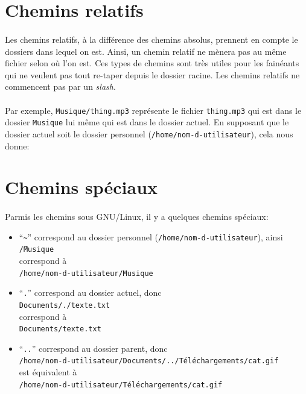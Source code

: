 \documentclass[french, a4paper, 12pt, titlepage]{article}
\begin{document}
\section{Chemins relatifs}

\paragraph{} Les chemins relatifs, à la différence des chemins absolus,
prennent en compte le dossiers dans lequel on est. Ainsi, un chemin relatif ne
mènera pas au même fichier selon où l'on est. Ces types de chemins sont très
utiles pour les fainéants qui ne veulent pas tout re-taper depuis le dossier
racine. Les chemins relatifs ne commencent pas par un \emph{slash}.

\paragraph{} Par exemple, \texttt{Musique/thing.mp3} représente le fichier
\texttt{thing.mp3} qui est dans le dossier \texttt{Musique} lui même qui est
dans le dossier actuel. En supposant que le dossier actuel soit le dossier
personnel (\texttt{/home/nom-d-utilisateur}), cela nous donne:
\\

\section{Chemins spéciaux}

\paragraph{} Parmis les chemins sous GNU/Linux, il y a quelques chemins
spéciaux:

\begin{itemize}
	\item ``\texttt{\~}'' correspond au dossier personnel
		(\texttt{/home/nom-d-utilisateur}), ainsi\\
		\texttt{\~/Musique}\\
		correspond à\\
		\texttt{/home/nom-d-utilisateur/Musique}
	\item ``\texttt{.}'' correspond au dossier actuel, donc\\
		\texttt{Documents/./texte.txt}\\
		correspond à\\
		\texttt{Documents/texte.txt}
	\item ``\texttt{..}'' correspond au dossier parent, donc\\
		\texttt{/home/nom-d-utilisateur/Documents/../Téléchargements/cat.gif}\\
		est équivalent à\\
		\texttt{/home/nom-d-utilisateur/Téléchargements/cat.gif}
\end{itemize}
\end{document}
